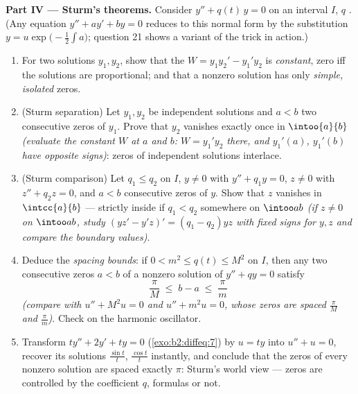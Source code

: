 \begin{problem}
\medskip
\noindent\textbf{Part IV --- Sturm's theorems.} Consider $y''
+ q(t)\,y = 0$ on an interval $I$, $q$ . (Any
equation $y'' + ay' + by = 0$ reduces to this normal form by
the substitution $y = u\exp\bigl(-\frac12\int a\bigr)$;
question 21 shows a variant of the trick in action.)
\begin{enumerate}[resume]
  \item For two solutions $y_1, y_2$, show that the 
        $W = y_1y_2' - y_1'y_2$ is \emph{constant}, zero iff
        the solutions are proportional; and that a nonzero
        solution has only \emph{simple, isolated} zeros.
  \item (Sturm separation) Let $y_1, y_2$ be independent
        solutions and $a < b$ two consecutive zeros of $y_1$.
        Prove that $y_2$ vanishes exactly once in
        $\intoo{a}{b}$ \emph{(evaluate the constant $W$ at $a$
        and $b$: $W = y_1'y_2$ there, and $y_1'(a)$,
        $y_1'(b)$ have opposite signs)}: zeros of independent
        solutions interlace.
  \item (Sturm comparison) Let $q_1 \leq q_2$ on $I$, $y \neq
        0$ with $y'' + q_1y = 0$, $z \neq 0$ with $z'' + q_2z
        = 0$, and $a < b$ consecutive zeros of $y$. Show that
        $z$ vanishes in $\intcc{a}{b}$ --- strictly inside if
        $q_1 < q_2$ somewhere on $\intoo ab$ \emph{(if $z \neq
        0$ on $\intoo ab$, study $(yz' - y'z)' = (q_1 -
        q_2)yz$ with fixed signs for $y, z$ and compare the
        boundary values)}.
  \item Deduce the \emph{spacing bounds}: if $0 < m^2 \leq
        q(t) \leq M^2$ on $I$, then any two consecutive zeros
        $a < b$ of a nonzero solution of $y'' + qy = 0$
        satisfy
        \[
        \frac{\pi}{M} \;\leq\; b - a \;\leq\; \frac{\pi}{m}
        \]
        \emph{(compare with $u'' + M^2u = 0$ and $u'' + m^2u
        = 0$, whose zeros are spaced $\frac\pi M$ and
        $\frac\pi m$)}. Check on the harmonic oscillator.
  \item Transform $ty'' + 2y' + ty = 0$
        (\cref{exo:b2:diffeq:7}) by $u = ty$ into $u'' + u =
        0$, recover its solutions $\frac{\sin t}t$,
        $\frac{\cos t}{t}$ instantly, and conclude that the
        zeros of every nonzero solution are spaced exactly
        $\pi$: Sturm's world view --- zeros are controlled by
        the coefficient $q$, formulas or not.
\end{enumerate}


\end{problem}
